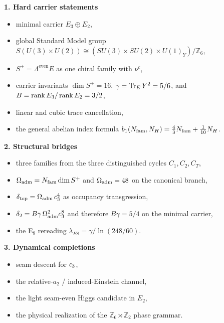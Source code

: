 \begin{tcolorbox}[colback=gray!5, colframe=gray!60, breakable,
    title={\textbf{Status boundary for the v2.9 rewrite}}, fonttitle=\bfseries]
\textbf{1. Hard carrier statements}
\begin{itemize}[leftmargin=1.5em, topsep=3pt, itemsep=2pt]
    \item minimal carrier $E_3\oplus E_2$,
    \item global Standard Model group $S(U(3)\times U(2)) \cong (SU(3)\times SU(2)\times U(1)_Y)/\mathbb Z_6$,
    \item $S^+=\Lambda^{\mathrm{even}}E$ as one chiral family with $\nu^c$,
    \item carrier invariants $\dim S^+=16$, $\gamma=\operatorname{Tr}_EY^2=5/6$, and $B=\operatorname{rank} E_3/\operatorname{rank} E_2=3/2$,
    \item linear and cubic trace cancellation,
    \item the general abelian index formula $b_1(N_{\mathrm{fam}},N_H)=\frac43 N_{\mathrm{fam}}+\frac1{10}N_H$.
\end{itemize}

\textbf{2. Structural bridges}
\begin{itemize}[leftmargin=1.5em, topsep=3pt, itemsep=2pt]
    \item three families from the three distinguished cycles $C_1,C_2,C_T$,
    \item $\Omega_{\mathrm{adm}}=N_{\mathrm{fam}}\dim S^+$ and $\Omega_{\mathrm{adm}}=48$ on the canonical branch,
    \item $\delta_{\mathrm{top}} = \Omega_{\mathrm{adm}}\,c_3^4$ as occupancy transgression,
    \item $\delta_2 = B\gamma\,\Omega_{\mathrm{adm}}^2c_3^8$ and therefore $B\gamma=5/4$ on the minimal carrier,
    \item the E$_8$ rereading $\lambda_{E8}=\gamma/\ln(248/60)$.
\end{itemize}

\textbf{3. Dynamical completions}
\begin{itemize}[leftmargin=1.5em, topsep=3pt, itemsep=2pt]
    \item seam descent for $c_3$,
    \item the relative-$a_2$ / induced-Einstein channel,
    \item the light seam-even Higgs candidate in $E_2$,
    \item the physical realization of the $\mathbb Z_6\rtimes \mathbb Z_2$ phase grammar.
\end{itemize}
\end{tcolorbox}

